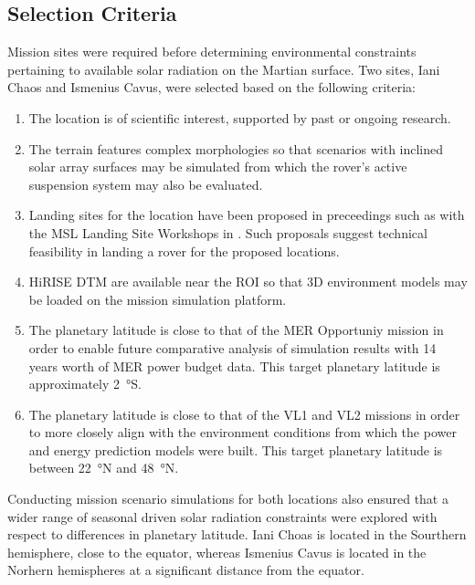 
\subsection{Selection Criteria}
\label{sec:MissionSites:SelectionCriteria}
Mission sites were required before determining environmental constraints pertaining to available solar radiation on the Martian surface. Two sites, Iani Chaos and Ismenius Cavus, were selected based on the following criteria:

\begin{enumerate}[label=\textbf{\textcolor{BulletBlue}{(\alph*)}}]
    \item The location is of scientific interest, supported by past or ongoing research.
    \item The terrain features complex morphologies so that scenarios with inclined solar array surfaces may be simulated from which the rover's active suspension system may also be evaluated.
    \item Landing sites for the location have been proposed in preceedings such as with the \ac{MSL} Landing Site Workshops in . Such proposals suggest technical feasibility in landing a rover for the proposed locations.
    \item \ac{HiRISE} \ac{DTM} are available near the \ac{ROI} so that 3D environment models may be loaded on the mission simulation platform.
    \item The planetary latitude is close to that of the \ac{MER} Opportuniy mission in order to enable future comparative analysis of simulation results with 14 years worth of \ac{MER} power budget data. This target planetary latitude is approximately \SI{2}{\degree}S.
    \item The planetary latitude is close to that of the \ac{VL1} and \ac{VL2} missions in order to more closely align with the environment conditions from which the power and energy prediction models were built. This target planetary latitude is between \SI{22}{\degree}N and \SI{48}{\degree}N.
\end{enumerate}

Conducting mission scenario simulations for both locations also ensured that a wider range of seasonal driven solar radiation constraints were explored with respect to differences in planetary latitude. Iani Choas is located in the Sourthern hemisphere, close to the equator, whereas Ismenius Cavus is located in the Norhern hemispheres at a significant distance from the equator.

